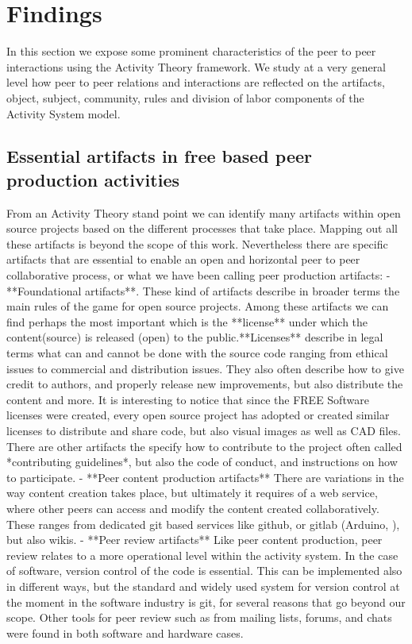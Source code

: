 \documentclass{ICED-Paper}%
\begin{document}
\section{Findings}

In this section we expose some prominent characteristics of the peer to peer interactions using the Activity Theory framework. We study at a very general level how peer to peer relations and interactions are reflected on the artifacts, object, subject, community, rules and division of labor components of the Activity System model.

\subsection{Essential artifacts in free based peer production activities}
From an Activity Theory stand point we can identify many artifacts within open source projects based on the different processes that take place. Mapping out all these artifacts is beyond the scope of this work. Nevertheless there are specific artifacts that are essential to enable an open and horizontal peer to peer collaborative process, or what we have been calling peer production artifacts:
- **Foundational artifacts**. These kind of artifacts describe in broader terms the main rules of the game for open source projects. Among these artifacts we can find perhaps the most important which is the **license** under which the content(source) is released (open) to the public.**Licenses** describe in legal terms what can and cannot be done with the source code ranging from ethical issues to commercial and distribution issues. They also often describe how to give credit to authors, and properly
release new improvements, but also distribute the content and more. It is interesting to notice that since the FREE Software licenses were created, every open source project has adopted or created similar licenses to distribute and share code, but also visual images as well as CAD files. There are other artifacts the specify how to contribute to the project often called *contributing guidelines*, but also the code of conduct, and instructions on how to participate.
- **Peer content production artifacts** There are variations in the way content creation takes place, but ultimately it requires of a web service, where other peers can access and modify the content created collaboratively. These ranges from dedicated git based services like github, or gitlab (Arduino, ), but also wikis.
- **Peer review artifacts** Like peer content production, peer review relates to a more operational level within the activity system. In the case of software, version control of the code is essential. This can be implemented also in different ways, but the standard and widely used system for version control at the moment in the software industry is git, for several reasons that go beyond our scope. Other tools for peer review such as from mailing lists, forums, and chats were found in both software and hardware cases.
\end{document}
